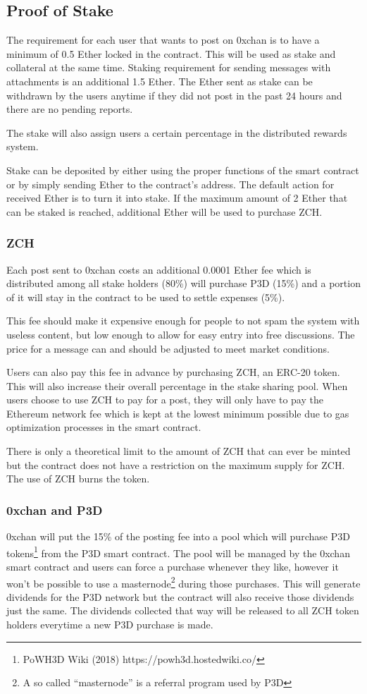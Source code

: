 \documentclass[a4paper]{article}
\newcommand{\projectname}{0xchan}
\begin{document}
\subsection{Proof of Stake}
The requirement for each user that wants to post on \projectname{} is to have a minimum of 0.5 Ether locked in the contract. This will be used as stake and collateral at the same time. Staking requirement for sending messages with attachments is an additional 1.5 Ether. The Ether sent as stake can be withdrawn by the users anytime if they did not post in the past 24 hours and there are no pending reports.

The stake will also assign users a certain percentage in the distributed rewards system.

Stake can be deposited by either using the proper functions of the smart contract or by simply sending Ether to the contract's address. The default action for received Ether is to turn it into stake. If the maximum amount of 2 Ether that can be staked is reached, additional Ether will be used to purchase ZCH.

\subsubsection{ZCH}
Each post sent to \projectname{} costs an additional 0.0001 Ether fee which is distributed among all stake holders (80\%) will purchase P3D (15\%) and a portion of it will stay in the contract to be used to settle expenses (5\%).

This fee should make it expensive enough for people to not spam the system with useless content, but low enough to allow for easy entry into free discussions. The price for a message can and should be adjusted to meet market conditions.

Users can also pay this fee in advance by purchasing ZCH, an ERC-20 token. This will also increase their overall percentage in the stake sharing pool. When users choose to use ZCH to pay for a post, they will only have to pay the Ethereum network fee which is kept at the lowest minimum possible due to gas optimization processes in the smart contract.

There is only a theoretical limit to the amount of ZCH that can ever be minted but the contract does not have a restriction on the maximum supply for ZCH. The use of ZCH burns the token.

\subsubsection{\projectname{} and P3D}
\projectname{} will put the 15\% of the posting fee into a pool which will purchase P3D tokens\footnote{PoWH3D Wiki (2018) https://powh3d.hostedwiki.co/} from the P3D smart contract. The pool will be managed by the \projectname{} smart contract and users can force a purchase whenever they like, however it won't be possible to use a masternode\footnote{A so called ``masternode'' is a referral program used by P3D} during those purchases. This will generate dividends for the P3D network but the contract will also receive those dividends just the same. The dividends collected that way will be released to all ZCH token holders everytime a new P3D purchase is made.
\end{document}
